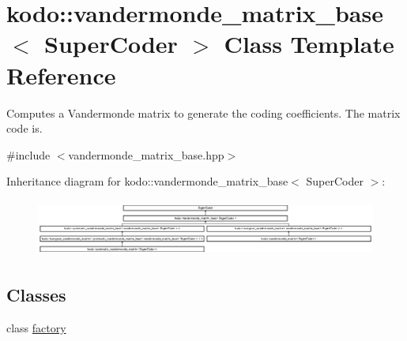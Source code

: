\hypertarget{classkodo_1_1vandermonde__matrix__base}{\section{kodo\-:\-:vandermonde\-\_\-matrix\-\_\-base$<$ Super\-Coder $>$ Class Template Reference}
\label{classkodo_1_1vandermonde__matrix__base}
}


Computes a Vandermonde matrix to generate the coding coefficients. The matrix code is.  




{\ttfamily \#include $<$vandermonde\-\_\-matrix\-\_\-base.\-hpp$>$}

Inheritance diagram for kodo\-:\-:vandermonde\-\_\-matrix\-\_\-base$<$ Super\-Coder $>$\-:\begin{figure}[H]
\begin{center}
\leavevmode
\includegraphics[height=1.891892cm]{classkodo_1_1vandermonde__matrix__base}
\end{center}
\end{figure}
\subsection*{Classes}
\begin{DoxyCompactItemize}
\item 
class \hyperlink{classkodo_1_1vandermonde__matrix__base_1_1factory}{factory}
\end{DoxyCompactItemize}
